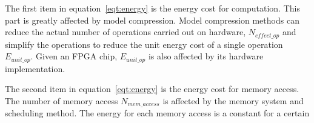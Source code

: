 The first item in equation~\ref{eqt:energy} is the energy cost for computation. This part is greatly affected by model compression. Model compression methods can reduce the actual number of operations carried out on hardware, $N_{effect\_op}$ and simplify the operations to reduce the unit energy cost of a single operation $E_{unit\_op}$. Given an FPGA chip, $E_{unit\_op}$ is also affected by its hardware implementation.

The second item in equation~\ref{eqt:energy} is the energy cost for memory access. The number of memory access $N_{mem\_access}$ is affected by the memory system and scheduling method. The energy for each memory access is a constant for a certain 

